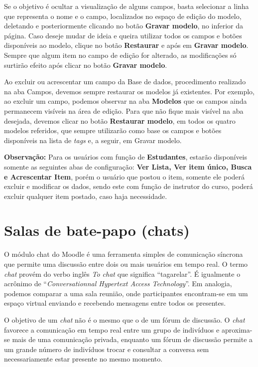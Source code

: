 Se o objetivo é ocultar a visualização de alguns campos, basta selecionar a linha que representa o nome e o campo, localizados no espaço de edição do modelo, deletando e posteriormente clicando no botão \textbf{Gravar modelo}, no inferior da página. Caso deseje mudar de ideia e queira utilizar todos os campos e botões disponíveis ao modelo, clique no botão \textbf{Restaurar} e após em \textbf{Gravar modelo}. Sempre que algum item no campo de edição for alterado, as modificações só surtirão efeito após clicar no botão \textbf{Gravar modelo}.
	
Ao excluir ou acrescentar um campo da Base de dados, procedimento realizado na aba Campos, devemos sempre restaurar os modelos já existentes. Por exemplo, ao excluir um campo, podemos observar na aba \textbf{Modelos} que os campos ainda permanecem visíveis na área de edição. Para que não fique mais visível na aba desejada, devemos clicar no botão \textbf{Restaurar modelo}, em todos os quatro modelos referidos, que sempre utilizarão como base os campos e botões disponíveis na lista de \textit{tags} e, a seguir, em Gravar modelo.

\textbf{Observação:} Para os usuários com função de \textbf{Estudantes}, estarão disponíveis somente as seguintes abas de configuração: \textbf{Ver Lista, Ver item único, Busca e Acrescentar Item}, porém o usuário que postou o item, somente ele poderá excluir e modificar os dados, sendo este com função de instrutor do curso, poderá excluir qualquer item postado, caso haja necessidade.

\section{Salas de bate-papo (chats)}

O módulo chat do Moodle é uma ferramenta simples de comunicação síncrona que permite uma discussão entre dois ou mais usuários em tempo real. O termo \textit{chat} provém do verbo inglês \textit{To chat} que significa ``tagarelar''. É igualmente o acrônimo de ``\textit{Conversationnal Hypertext Access Technology}''. Em analogia, podemos comparar a uma sala reunião, onde participantes encontram-se em um espaço virtual enviando e recebendo mensagens entre todos os presentes.

O objetivo de um \textit{chat} não é o mesmo que o de um fórum de discussão. O \textit{chat} favorece a comunicação em tempo real entre um grupo de indivíduos e aproxima-se mais de uma comunicação privada, enquanto um fórum de discussão permite a um grande número de indivíduos trocar e consultar a conversa sem necessariamente estar presente no mesmo momento.

